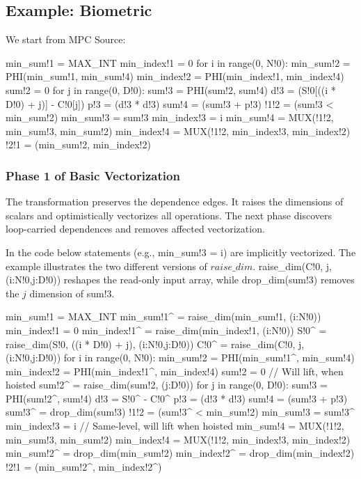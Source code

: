 
%

\subsection{Example: Biometric}

We start from MPC Source:

{\small
\begin{pythonn}
min_sum!1 = MAX_INT
min_index!1 = 0
for i in range(0, N!0):
   min_sum!2 = PHI(min_sum!1, min_sum!4)
   min_index!2 = PHI(min_index!1, min_index!4)
   sum!2 = 0
   for j in range(0, D!0):
     sum!3 = PHI(sum!2, sum!4)
     d!3 = (S!0[((i * D!0) + j)] - C!0[j])
     p!3 = (d!3 * d!3)
     sum!4 = (sum!3 + p!3)
   !1!2 = (sum!3 < min_sum!2)
   min_sum!3 = sum!3
   min_index!3 = i
   min_sum!4 = MUX(!1!2, min_sum!3, min_sum!2)
   min_index!4 = MUX(!1!2, min_index!3, min_index!2)
!2!1 = (min_sum!2, min_index!2)   
\end{pythonn}
}

\subsubsection{Phase 1 of Basic Vectorization}

The transformation preserves the dependence edges. It raises the dimensions of scalars and optimistically vectorizes all operations. 
The next phase discovers loop-carried dependences and removes affected vectorization.

In the code below statements (e.g., {\sf min\_sum!3 = i}) are implicitly vectorized. 
The example illustrates the two different versions of $\mathit{raise\_dim}$. {\sf raise\_dim(C!0, j, (i:N!0,j:D!0))} reshapes
the read-only input array, while {\sf drop\_dim(sum!3)} removes the $j$ dimension of {\sf sum!3}.

{\small
\begin{pythonn}
min_sum!1 = MAX_INT
min_sum!1^ = raise_dim(min_sum!1, (i:N!0))
min_index!1 = 0
min_index!1^ = raise_dim(min_index!1, (i:N!0))
S!0^ = raise_dim(S!0, ((i * D!0) + j), (i:N!0,j:D!0))
C!0^ = raise_dim(C!0, j, (i:N!0,j:D!0))
for i in range(0, N!0):
   min_sum!2 = PHI(min_sum!1^, min_sum!4)
   min_index!2 = PHI(min_index!1^, min_index!4) 
   sum!2 = 0 // Will lift, when hoisted
   sum!2^ = raise_dim(sum!2, (j:D!0)) 
   for j in range(0, D!0):
      sum!3 = PHI(sum!2^, sum!4)
      d!3 = S!0^ - C!0^
      p!3 = (d!3 * d!3) 
      sum!4 = (sum!3 + p!3)
   sum!3^ = drop_dim(sum!3)     
   !1!2 = (sum!3^ < min_sum!2)
   min_sum!3 = sum!3^
   min_index!3 = i  // Same-level, will lift when hoisted
   min_sum!4 = MUX(!1!2, min_sum!3, min_sum!2)
   min_index!4 = MUX(!1!2, min_index!3, min_index!2)
min_sum!2^ = drop_dim(min_sum!2)
min_index!2^ = drop_dim(min_index!2)   
!2!1 = (min_sum!2^, min_index!2^)     
\end{pythonn}
}

